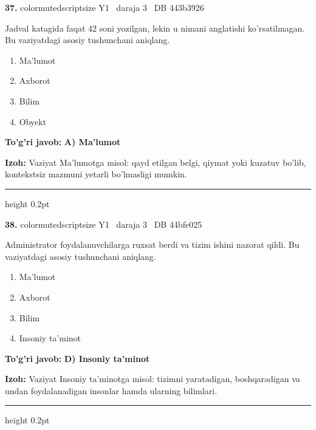 \documentclass[10pt,a4paper,oneside]{article}
\begin{document}
\noindent\textbf{\color{ink}37.}  {color{muted}scriptsize Y1 \textbullet\ daraja 3 \textbullet\ DB 443b3926}
\par
Jadval katagida faqat 42 soni yozilgan, lekin u nimani anglatishi ko'rsatilmagan. Bu vaziyatdagi asosiy tushunchani aniqlang.
\begin{enumerate}[label=\Alph*),leftmargin=9mm]
\item Ma'lumot
\item Axborot
\item Bilim
\item Obyekt
\end{enumerate}
\begin{tcolorbox}[enhanced,breakable,colback=teal!4,colframe=teal!50!black,boxrule=0.5pt,arc=1.1mm,left=3mm,right=3mm,top=1.7mm,bottom=1.7mm,before skip=2mm,after skip=2mm]
\textbf{\color{teal}To'g'ri javob:} \textbf{A) Ma'lumot}
\par\smallskip
\textbf{Izoh:} Vaziyat Ma'lumotga misol: qayd etilgan belgi, qiymat yoki kuzatuv bo'lib, kontekstsiz mazmuni yetarli bo'lmasligi mumkin.
\end{tcolorbox}
\vspace{2mm}\hrule height 0.2pt \vspace{3mm}

\noindent\textbf{\color{ink}38.}  {color{muted}scriptsize Y1 \textbullet\ daraja 3 \textbullet\ DB 44bfe025}
\par
Administrator foydalanuvchilarga ruxsat berdi va tizim ishini nazorat qildi. Bu vaziyatdagi asosiy tushunchani aniqlang.
\begin{enumerate}[label=\Alph*),leftmargin=9mm]
\item Ma'lumot
\item Axborot
\item Bilim
\item Insoniy ta'minot
\end{enumerate}
\begin{tcolorbox}[enhanced,breakable,colback=teal!4,colframe=teal!50!black,boxrule=0.5pt,arc=1.1mm,left=3mm,right=3mm,top=1.7mm,bottom=1.7mm,before skip=2mm,after skip=2mm]
\textbf{\color{teal}To'g'ri javob:} \textbf{D) Insoniy ta'minot}
\par\smallskip
\textbf{Izoh:} Vaziyat Insoniy ta'minotga misol: tizimni yaratadigan, boshqaradigan va undan foydalanadigan insonlar hamda ularning bilimlari.
\end{tcolorbox}
\vspace{2mm}\hrule height 0.2pt \vspace{3mm}
\end{document}
